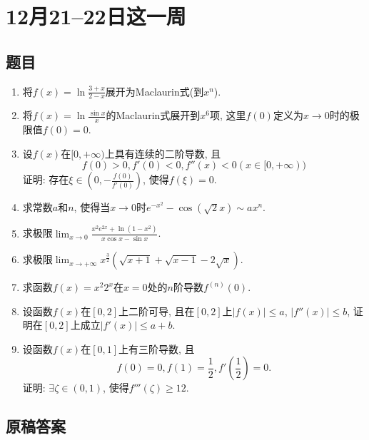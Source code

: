 \documentclass[UTF8,11pt, a4paper, oneside, fontset=none]{ctexbook}
\begin{document}
\clearpage

\section{12月21--22日这一周}

\subsection*{题目}

\begin{enumerate}

\item 将$f(x) = \ln \frac{3+x}{2-x}$展开为Maclaurin式(到$x^n$).

\item 将$f(x) = \ln \frac{\sin x}{x}$的Maclaurin式展开到$x^6$项, 这里$f(0)$定义为$x \to 0$时的极限值$f(0) = 0$.

\item 设$f(x)$在$[0, + \infty)$上具有连续的二阶导数, 且
\[
f(0) >0, f'(0) <0, f''(x) < 0 (x \in [0, + \infty))
\]
证明: 存在$\xi \in \left( 0, - \frac{f(0)}{f'(0)}\right)$, 使得$f(\xi ) = 0$.

\item 求常数$a$和$n$, 使得当$x \to 0$时$e^{-x^2} - \cos(\sqrt{2}x) \sim ax^n$.

\item 求极限$\lim_{x \to 0} \frac{x^2 e^{2x} + \ln (1 - x^2)}{x \cos x - \sin x}$.

\item 求极限$\lim_{x \to +\infty} x^{\frac{3}{2}} (\sqrt{x+1} + \sqrt{x-1} - 2 \sqrt x)$.

\item 求函数$f(x) = x^2 2^x$在$x = 0$处的$n$阶导数$f^{(n)}(0)$.

\item 设函数$f(x)$在$[0, 2]$上二阶可导, 且在$[0, 2]$上$|f(x)| \leq a$, $|f''(x)| \leq b$, 证明在$[0, 2]$上成立$|f'(x)| \leq a+b$.

\item 设函数$f(x)$在$[0, 1]$上有三阶导数, 且
\[
f(0) = 0, f(1) = \frac{1}{2}, f'\left( \frac{1}{2} \right) =0.
\]
证明: $\exists \zeta \in (0, 1)$, 使得$f'''(\zeta) \geq 12$.

\end{enumerate}

\clearpage

\subsection*{原稿答案}
\end{document}
